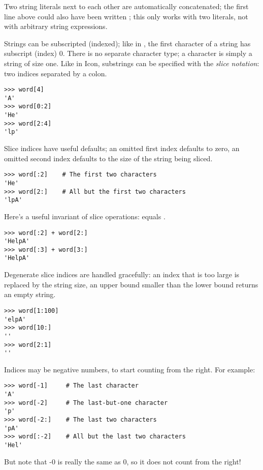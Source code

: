 \documentclass{manual}
\begin{document}
Two string literals next to each other are automatically concatenated;
the first line above could also have been written ; this only works with two literals, not with arbitrary string expressions.

Strings can be subscripted (indexed); like in \C{}, the first character
of a string has subscript (index) 0.  There is no separate character
type; a character is simply a string of size one.  Like in Icon,
substrings can be specified with the \emph{slice notation}: two indices
separated by a colon.

\begin{verbatim}
>>> word[4]
'A'
>>> word[0:2]
'He'
>>> word[2:4]
'lp'
\end{verbatim}

Slice indices have useful defaults; an omitted first index defaults to
zero, an omitted second index defaults to the size of the string being
sliced.

\begin{verbatim}
>>> word[:2]    # The first two characters
'He'
>>> word[2:]    # All but the first two characters
'lpA'
\end{verbatim}

Here's a useful invariant of slice operations: 
equals .

\begin{verbatim}
>>> word[:2] + word[2:]
'HelpA'
>>> word[:3] + word[3:]
'HelpA'
\end{verbatim}

Degenerate slice indices are handled gracefully: an index that is too
large is replaced by the string size, an upper bound smaller than the
lower bound returns an empty string.

\begin{verbatim}
>>> word[1:100]
'elpA'
>>> word[10:]
''
>>> word[2:1]
''
\end{verbatim}

Indices may be negative numbers, to start counting from the right.
For example:

\begin{verbatim}
>>> word[-1]     # The last character
'A'
>>> word[-2]     # The last-but-one character
'p'
>>> word[-2:]    # The last two characters
'pA'
>>> word[:-2]    # All but the last two characters
'Hel'
\end{verbatim}

But note that -0 is really the same as 0, so it does not count from
the right!
\end{document}

